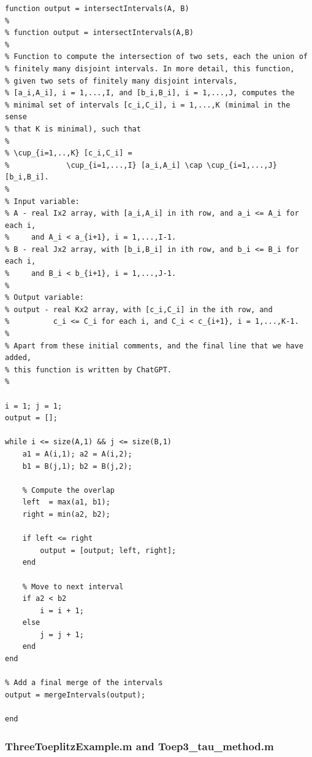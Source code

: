 \documentclass[preprint,1p,11pt]{elsarticle}
\numberwithin{equation}{section}   %
\numberwithin{figure}{section}  %
\begin{document}
\begin{verbatim}
function output = intersectIntervals(A, B)
%
% function output = intersectIntervals(A,B)
%
% Function to compute the intersection of two sets, each the union of
% finitely many disjoint intervals. In more detail, this function,
% given two sets of finitely many disjoint intervals, 
% [a_i,A_i], i = 1,...,I, and [b_i,B_i], i = 1,...,J, computes the 
% minimal set of intervals [c_i,C_i], i = 1,...,K (minimal in the sense 
% that K is minimal), such that
%
% \cup_{i=1,..,K} [c_i,C_i] = 
%             \cup_{i=1,...,I} [a_i,A_i] \cap \cup_{i=1,...,J} [b_i,B_i].
%
% Input variable:
% A - real Ix2 array, with [a_i,A_i] in ith row, and a_i <= A_i for each i,
%     and A_i < a_{i+1}, i = 1,...,I-1.
% B - real Jx2 array, with [b_i,B_i] in ith row, and b_i <= B_i for each i,
%     and B_i < b_{i+1}, i = 1,...,J-1.
%
% Output variable:
% output - real Kx2 array, with [c_i,C_i] in the ith row, and
%          c_i <= C_i for each i, and C_i < c_{i+1}, i = 1,...,K-1.
%
% Apart from these initial comments, and the final line that we have added,
% this function is written by ChatGPT.
%

i = 1; j = 1;
output = [];

while i <= size(A,1) && j <= size(B,1)
    a1 = A(i,1); a2 = A(i,2);
    b1 = B(j,1); b2 = B(j,2);
   
    % Compute the overlap
    left  = max(a1, b1);
    right = min(a2, b2);
   
    if left <= right
        output = [output; left, right];
    end
   
    % Move to next interval
    if a2 < b2
        i = i + 1;
    else
        j = j + 1;
    end
end

% Add a final merge of the intervals
output = mergeIntervals(output);

end
\end{verbatim}

\subsubsection{ThreeToeplitzExample.m and Toep3\_tau\_method.m} \label{code:Toep3}
\end{document}
